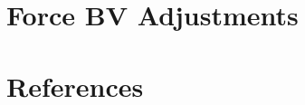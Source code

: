 \documentclass{article}
\newcommand{\sectiontitle}{}
\newcommand{\newsection}[2]{\renewcommand{\sectiontitle}{#2}\section{#1}}
\begin{document}


\newpage

\newsection{Force BV Adjustments}{bv-adjustments}
\label{sec:force_bv_adjustments}



\newpage

\newsection{References}{references}
\label{sec:references}



\newpage
\end{document}
